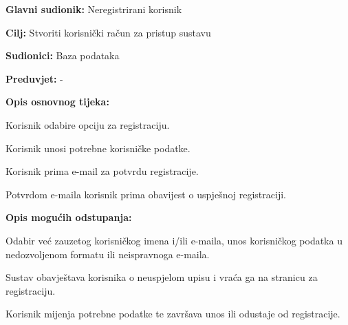 					\noindent {}
					\begin{packed_item}
	
						\item \textbf{Glavni sudionik: }Neregistrirani korisnik
						\item  \textbf{Cilj:} Stvoriti korisnički račun za pristup sustavu
						\item  \textbf{Sudionici:} Baza podataka
						\item  \textbf{Preduvjet:} -
						\item  \textbf{Opis osnovnog tijeka:}
						
						\item[] \begin{packed_enum}
	
							\item Korisnik odabire opciju za registraciju.
							\item Korisnik unosi potrebne korisničke podatke.
							\item Korisnik prima e-mail za potvrdu registracije.
							\item Potvrdom e-maila korisnik prima obavijest o uspješnoj registraciji.
						\end{packed_enum}
						
						\item  \textbf{Opis mogućih odstupanja:}
						
						\item[] \begin{packed_item}
	
							\item[2.a] Odabir već zauzetog korisničkog imena i/ili e-maila, unos korisničkog podatka u nedozvoljenom formatu ili neispravnoga e-maila.
							\item[] \begin{packed_enum}
								
								\item Sustav obavještava korisnika o neuspjelom upisu i vraća ga na stranicu za registraciju.
								\item Korisnik mijenja potrebne podatke te završava unos ili odustaje od registracije.
								
							\end{packed_enum}
							
						\end{packed_item}
					\end{packed_item}
				\noindent {}
